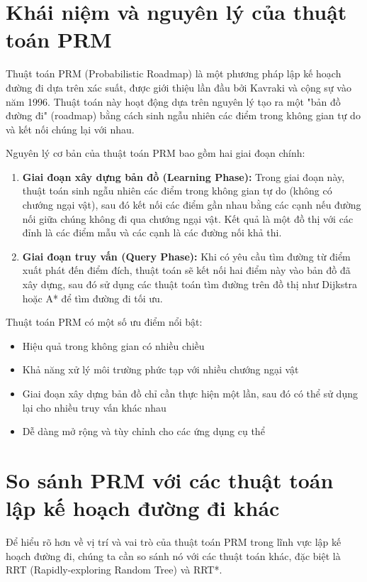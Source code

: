 \documentclass[12pt,a4paper,openany,oneside]{report}
\begin{document}
\section{Khái niệm và nguyên lý của thuật toán PRM}

Thuật toán PRM (Probabilistic Roadmap) là một phương pháp lập kế hoạch đường đi dựa trên xác suất, được giới thiệu lần đầu bởi Kavraki và cộng sự vào năm 1996. Thuật toán này hoạt động dựa trên nguyên lý tạo ra một "bản đồ đường đi" (roadmap) bằng cách sinh ngẫu nhiên các điểm trong không gian tự do và kết nối chúng lại với nhau.

Nguyên lý cơ bản của thuật toán PRM bao gồm hai giai đoạn chính:

\begin{enumerate}
    \item \textbf{Giai đoạn xây dựng bản đồ (Learning Phase):} Trong giai đoạn này, thuật toán sinh ngẫu nhiên các điểm trong không gian tự do (không có chướng ngại vật), sau đó kết nối các điểm gần nhau bằng các cạnh nếu đường nối giữa chúng không đi qua chướng ngại vật. Kết quả là một đồ thị với các đỉnh là các điểm mẫu và các cạnh là các đường nối khả thi.
    
    \item \textbf{Giai đoạn truy vấn (Query Phase):} Khi có yêu cầu tìm đường từ điểm xuất phát đến điểm đích, thuật toán sẽ kết nối hai điểm này vào bản đồ đã xây dựng, sau đó sử dụng các thuật toán tìm đường trên đồ thị như Dijkstra hoặc A* để tìm đường đi tối ưu.
\end{enumerate}

Thuật toán PRM có một số ưu điểm nổi bật:
\begin{itemize}
    \item Hiệu quả trong không gian có nhiều chiều
    \item Khả năng xử lý môi trường phức tạp với nhiều chướng ngại vật
    \item Giai đoạn xây dựng bản đồ chỉ cần thực hiện một lần, sau đó có thể sử dụng lại cho nhiều truy vấn khác nhau
    \item Dễ dàng mở rộng và tùy chỉnh cho các ứng dụng cụ thể
\end{itemize}

\section{So sánh PRM với các thuật toán lập kế hoạch đường đi khác}

Để hiểu rõ hơn về vị trí và vai trò của thuật toán PRM trong lĩnh vực lập kế hoạch đường đi, chúng ta cần so sánh nó với các thuật toán khác, đặc biệt là RRT (Rapidly-exploring Random Tree) và RRT*.
\end{document}
